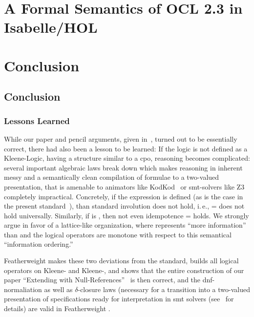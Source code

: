 \documentclass[11pt,a4paper,openright,twoside,abstracton]{scrreprt}
\newcommand{\ie}{i.\,e.\xspace}
\begin{document}
\part{A Formal Semantics of OCL 2.3 in Isabelle/HOL}


\part{Conclusion}

\chapter{Conclusion}

\section{Lessons Learned}
While our paper and pencil arguments, given
in~\cite{brucker.ea:ocl-null:2009}, turned out to be essentially
correct, there had also been a lesson to be learned: If the logic is
not defined as a Kleene-Logic, having a structure similar to a
\acf{cpo}, reasoning becomes complicated: several important algebraic laws break down
which makes reasoning in \OCL inherent messy and a semantically clean
compilation of \OCL formulae to a two-valued presentation, that is
amenable to animators like KodKod~\cite{torlak.ea:kodkod:2007} or
\acs{smt}-solvers like Z3~\cite{moura.ea:z3:2008} completely
impractical. Concretely, if the expression 
is defined  (as is the case in the
present standard~\cite{omg:ocl:2012}), than standard involution does
not hold, \ie,  =  does not hold
universally. Similarly, if
 is , then not even
idempotence  =  holds. We strongly argue in favor of a lattice-like
organization, where  represents ``more information''
than  and the logical operators are monotone with
respect to this semantical ``information ordering.''

Featherweight \OCL makes these two deviations from the standard,
builds all logical operators on Kleene- and
Kleene-, and shows that the entire construction of our
paper ``Extending \OCL with
Null-References''~\cite{brucker.ea:ocl-null:2009} is then correct, and
the \acs{dnf}-normaliation as well as $\delta$-closure laws (necessary
for a transition into a two-valued presentation of \OCL specifications
ready for interpretation in \acs{smt} solvers
(see~\cite{brucker.ea:ocl-testing:2010} for details) are valid in
Featherweight \OCL.
\end{document}
